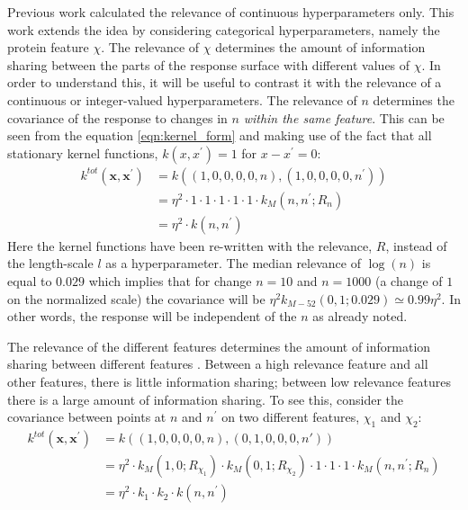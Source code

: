 Previous work \cite{bergstrajamesbergstraRandomSearchHyperParameter2012} calculated the relevance of continuous hyperparameters only.  This work extends the idea by considering categorical hyperparameters, namely the protein feature $\chi$. The relevance of $\chi$ determines the amount of information sharing between the parts of the response surface with different values of $\chi$. In order to understand this, it will be useful to contrast it with  the relevance of a continuous or integer-valued hyperparameters.  The relevance of $n$ determines the covariance of the response to changes in $n$ \emph{within the same feature}. This can be seen from the equation \ref{eqn:kernel_form} and making use of the fact that all stationary kernel functions, $k(x, x^{\prime})=1$ for $x-x^{\prime}=0$:
\begin{equation*}
\begin{split}
    k^{tot}(\mathbf{x}, \mathbf{x}^{\prime})& = k\left((1, 0, 0, 0, 0, n), (1, 0, 0, 0, 0, n^{\prime})\right) \\
    & = \eta^{2}\cdot 1 \cdot 1\cdot 1 \cdot 1\cdot 1 \cdot k_{M}(n, n^{\prime}; R_{n}) \\
    & = \eta^{2}\cdot k(n, n^{\prime})
\end{split}
\end{equation*}
Here the kernel functions have been re-written with the relevance, $R$, instead of the length-scale $l$ as a hyperparameter. The median relevance of $\log{(n)}$ is equal to $\num{0.029}$ which implies that for change $n=10$ and $n=1000$ (a change of $1$ on the normalized scale) the covariance will be $\eta^{2}k_{M-52}(0,1; 0.029) \simeq 0.99\eta^{2}$. In other words, the response will be independent of the $n$ as already noted. 

The relevance of the different features determines the amount of information sharing between different features \cite{duvenaud2011additive}. Between a high relevance feature and all other features, there is little information sharing; between low relevance features there is a large amount of information sharing. To see this, consider the covariance between points at $n$ and $n^{\prime}$ on two different features, $\chi_1$ and $\chi_2$: 
\begin{equation*}
\begin{split}
    k^{tot}(\mathbf{x}, \mathbf{x}^{\prime})& = k\left((1, 0, 0, 0, 0, n), (0, 1, 0, 0, 0, n')\right) \\
    & = \eta^{2}\cdot k_{M}\left(1, 0; R_{\chi_1}\right) \cdot k_{M}\left(0, 1; R_{\chi_2}\right) \cdot 1 \cdot 1\cdot 1 \cdot k_{M}(n, n^{\prime}; R_{n}) \\
    &=  \eta^{2}\cdot k_{1}\cdot k_{2}\cdot k(n, n^{\prime})
\end{split}
\end{equation*}


